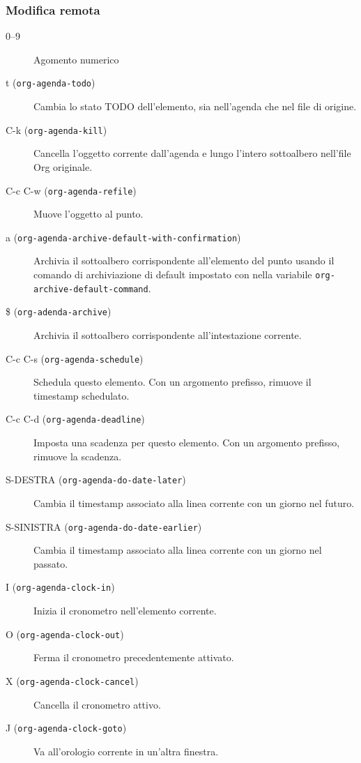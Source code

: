 \documentclass[11pt]{article}
\begin{document}
\subsubsection*{Modifica remota}
\label{sec:orga5c6d00}
\begin{description}
\item[{0--9}] Agomento numerico

\item[{t (\texttt{org-agenda-todo})}] Cambia lo stato TODO dell'elemento, sia nell'agenda che nel file di
origine.

\item[{C-k (\texttt{org-agenda-kill})}] Cancella l'oggetto corrente dall'agenda e lungo l'intero sottoalbero
nell'file Org originale.

\item[{C-c C-w (\texttt{org-agenda-refile})}] Muove l'oggetto al punto.

\item[{a (\texttt{org-agenda-archive-default-with-confirmation})}] Archivia il sottoalbero corrispondente all'elemento del punto usando
il comando di archiviazione di default impostato con nella variabile
\texttt{org-archive-default-command}.

\item[{\$ (\texttt{org-adenda-archive})}] Archivia il sottoalbero corrispondente all'intestazione corrente.

\item[{C-c C-s (\texttt{org-agenda-schedule})}] Schedula questo elemento. Con un argomento prefisso, rimuove il
timestamp schedulato.

\item[{C-c C-d (\texttt{org-agenda-deadline})}] Imposta una scadenza per questo elemento. Con un argomento prefisso,
rimuove la scadenza.

\item[{S-DESTRA (\texttt{org-agenda-do-date-later})}] Cambia il timestamp associato alla linea corrente con un giorno nel
futuro.

\item[{S-SINISTRA (\texttt{org-agenda-do-date-earlier})}] Cambia il timestamp associato alla linea corrente con un giorno nel
passato.

\item[{I (\texttt{org-agenda-clock-in})}] Inizia il cronometro nell'elemento corrente.

\item[{O (\texttt{org-agenda-clock-out})}] Ferma il cronometro precedentemente attivato.

\item[{X (\texttt{org-agenda-clock-cancel})}] Cancella il cronometro attivo.

\item[{J (\texttt{org-agenda-clock-goto})}] Va all'orologio corrente in un'altra finestra.
\end{description}
\end{document}
